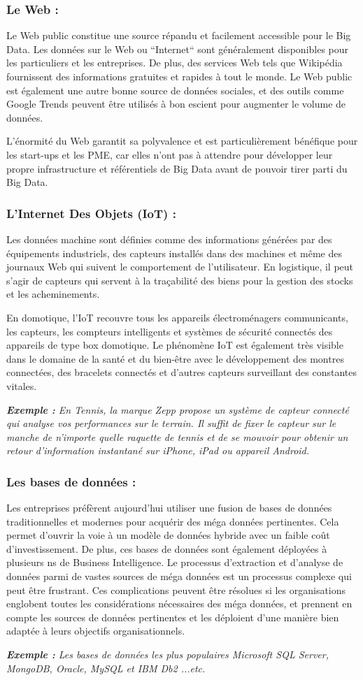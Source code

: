 \subsubsection{Le Web :}
Le Web public constitue une source répandu et facilement accessible pour le Big Data. Les données sur le Web ou “Internet“ sont généralement disponibles pour les particuliers et les entreprises. De plus, des services Web tels que Wikipédia fournissent des informations gratuites et rapides à tout le monde. Le Web public est également une autre bonne source de données sociales, et des outils comme Google Trends peuvent être utilisés à bon escient pour augmenter le volume de données.

L'énormité du Web garantit sa polyvalence et est particulièrement bénéfique pour les start-ups et les PME, car elles n'ont pas à attendre pour développer leur propre infrastructure et référentiels de Big Data avant de pouvoir tirer parti du Big Data.

\subsubsection{L'Internet Des Objets (IoT) :}
Les données machine sont définies comme des informations générées par des équipements industriels, des capteurs installés dans des machines et même des journaux Web qui suivent le comportement de l'utilisateur. En logistique, il peut s'agir de capteurs qui servent à la traçabilité des biens pour la gestion des stocks et les acheminements.

En domotique, l'IoT recouvre tous les appareils électroménagers communicants, les capteurs, les compteurs intelligents et systèmes de sécurité connectés des appareils de type box domotique. Le phénomène IoT est également très visible dans le domaine de la santé et du bien-être avec le développement des montres connectées, des bracelets connectés et d'autres capteurs surveillant des constantes vitales.

\textit{\textbf{Exemple :} En Tennis, la marque Zepp propose un système de capteur connecté qui analyse vos performances sur le terrain. Il suffit de fixer le capteur sur le manche de n'importe quelle raquette de tennis et de se mouvoir pour obtenir un retour d'information instantané sur iPhone, iPad ou appareil Android.}

\subsubsection{Les bases de données :}
Les entreprises préfèrent aujourd'hui utiliser une fusion de bases de données traditionnelles et modernes pour acquérir des méga données pertinentes. Cela permet d'ouvrir la voie à un modèle de données hybride avec un faible coût d'investissement. De plus, ces bases de données sont également déployées à plusieurs  ns de Business Intelligence. Le processus d'extraction et d'analyse de données parmi de vastes sources de méga données est un processus complexe qui peut être frustrant. Ces complications peuvent être résolues si les organisations englobent toutes les considérations nécessaires des méga données, et prennent en compte les sources de données pertinentes et les déploient d'une manière bien adaptée à leurs objectifs organisationnels.

\textit{\textbf{Exemple :} Les bases de données les plus populaires Microsoft SQL Server, MongoDB, Oracle, MySQL et IBM Db2 ...etc.}

